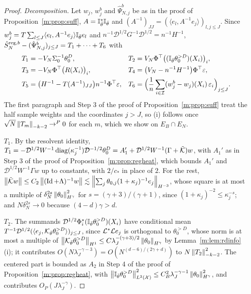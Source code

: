 \begin{proof}
\emph{Decomposition.} Let $w_j$, $w^b_j$ and $\hat\Psi^b_{N,j}$ be as in the proof of Proposition~\ref{m:prop:suff}, $A=\mathbb{I}^*_{\bar\theta}\mathbb{I}_{\bar\theta}$ and $(A^{-1})_{JJ}=(\langle e_l,A^{-1}e_j\rangle)_{l,j\le J}$. Since $w^b_j=T\sum_{l\le J}\langle e_l,A^{-1}e_j\rangle\mathbb{I}_{\bar\theta}e_l$ and $n^{-1}\mathcal D^{1/2}G^{-1}\mathcal D^{1/2}=n^{-1}H^{-1}$, $\hat S^{{\rm reg},b}_N-(\hat\Psi^b_{N,j})_{j\le J}=T_1+\dots+T_6$ with
\[
\begin{aligned}
T_1&=-V_N\Sigma_0^{-1}\theta_0^D, & T_2&=V_N\Phi^\top\big((\mathbb{I}_{\bar\theta}\theta_0^{>D})(X_i)\big)_i,\\
T_3&=-V_N\Phi^\top\big(R(X_i)\big)_i, & T_4&=\big(V_N-n^{-1}H^{-1}\big)\Phi^\top\varepsilon,\\
T_5&=\big(H^{-1}-T(A^{-1})_{JJ}\big)n^{-1}\Phi^\top\varepsilon, & T_6&=\Big(\frac1n\sum_{i\in\mathcal I}(w^b_j-w_j)(X_i)\,\varepsilon_i\Big)_{j\le J}.
\end{aligned}
\]
The first paragraph and Step 3 of the proof of Proposition~\ref{m:prop:suff} treat the half sample weights and the coordinates $j>J$, so (i) follows once $\sqrt N\left\|T_m\right\|_{-k-2}\to^P0$ for each $m$, which we show on $E_B\cap E_N$.

\emph{$T_1$.} By the resolvent identity, $T_1=-\mathcal D^{1/2}W^{-1}\operatorname{diag}(\kappa_j^{-1})\mathcal D^{-1/2}\theta_0^D=A_1'+\mathcal D^{1/2}W^{-1}(\Gamma+\tilde{\mathcal{K}})w$, with $A_1'$ as in Step 3 of the proof of Proposition~\ref{m:prop:regheat}, which bounds $A_1'$ and $\mathcal D^{1/2}W^{-1}\Gamma w$ up to constants, with $2/c_*$ in place of $2$. For the rest, $\left\|\tilde{\mathcal{K}} w\right\|\le C_2\left\|(\operatorname{Id}+\Lambda)^{-1}w\right\|\lesssim\left\|\sum_j\theta_{0,j}(1+\kappa_j)^{-1}e_j\right\|_{H^{-3}}$, whose square is at most a multiple of $\delta_N^{2s}\left\|\theta_0\right\|^2_{H^\gamma}$ for $s=(\gamma+3)/(\gamma+1)$, since $(1+\kappa_j)^{-2}\le\kappa_j^{-s}$; and $N\delta_N^{2s}\to0$ because $(4-d)\gamma>d$.

\emph{$T_2$.} The summands $\mathcal D^{1/2}\Phi_i^*(\mathbb{I}_{\bar\theta}\theta_0^{>D})(X_i)$ have conditional mean $T^{-1}\mathcal D^{1/2}(\langle e_j,\mathcal{K}_{\bar\theta}\theta_0^{>D}\rangle)_{j\le J}$, since $\mathcal{L}^*\mathcal{L} e_j$ is orthogonal to $\theta_0^{>D}$, whose norm is at most a multiple of $\left\|\mathcal{K}_{\bar\theta}\theta_0^{>D}\right\|_{H^1}\le C\lambda_J^{-(\gamma+3)/2}\left\|\theta_0\right\|_{H^\gamma}$ by Lemma~\ref{m:lem:rdinfo}(i); it contributes $O(N\lambda_J^{-\gamma-3})=O(N^{(d-6)/(2\gamma+d)})$ to $N\left\|T_2\right\|^2_{-k-2}$. The centered part is bounded as $A_2$ in Step 4 of the proof of Proposition~\ref{m:prop:regheat}, with $\left\|\mathbb{I}_{\bar\theta}\theta_0^{>D}\right\|^2_{L^2(\mathcal X)}\le C_B^2\lambda_J^{-\gamma-1}\left\|\theta_0\right\|^2_{H^\gamma}$, and contributes $O_P(J\lambda_J^{-\gamma})$.


\end{proof}
